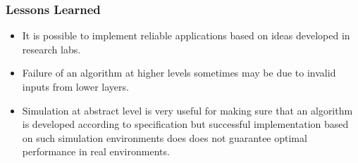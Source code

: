 \subsubsection{Lessons Learned}

\begin{itemize}
\item It is possible to implement reliable applications based on ideas developed in research labs. 
\item Failure of an algorithm at higher levels sometimes may be due to invalid inputs from lower layers.
\item Simulation at abstract level is very useful for making sure that an algorithm is developed according to specification but successful implementation based on such simulation environments does does not guarantee optimal performance in real environments.
\end{itemize}